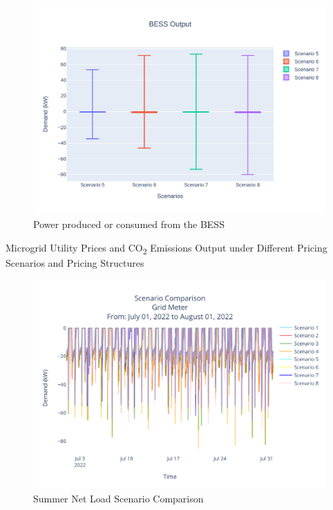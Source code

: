 \documentclass[conference]{IEEEtran}
\begin{document}
	\begin{figure}[H]
		\centering
		\includegraphics[width=0.9\linewidth]{Fig/bess_boxplot}
		\caption{Power produced or consumed from the BESS}
		\label{fig:bessboxplot}
	\end{figure}
	

	\begin{table}[H]
		\caption{Microgrid Utility Prices and CO\textsubscript{2} Emissions Output under Different Pricing Scenarios and Pricing Structures}
		\tiny
		\centering
		
		\normalsize
		\label{tab:emissions}
	\end{table}
	

    
	\begin{figure}[H]
		\centering
		\includegraphics[width=1\linewidth]{Fig/net_load_scenario_comparison_summer}
		\caption{Summer Net Load Scenario Comparison}
		\label{fig:netloadscenariocomparisonsummer}
	\end{figure}
\end{document}
